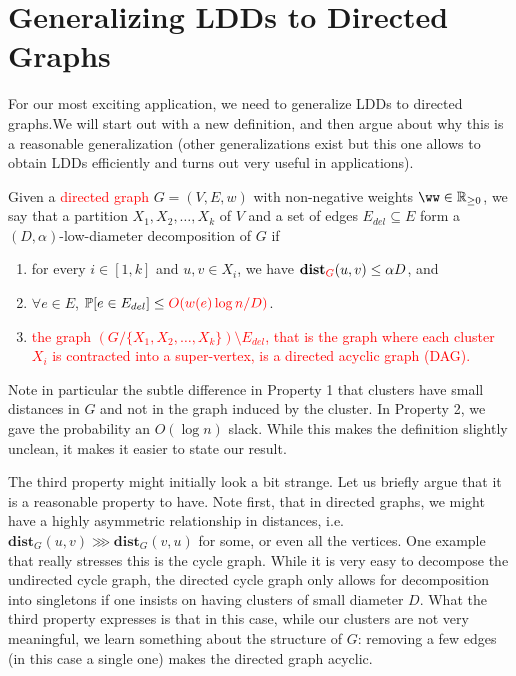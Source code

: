 \section{Generalizing LDDs to Directed Graphs}

For our most exciting application, we need to generalize LDDs to directed graphs.We will start out with a new definition, and then argue about why this is a reasonable generalization (other generalizations exist but this one allows to obtain LDDs efficiently and turns out very useful in applications).

\begin{definition}
Given a \textcolor{red}{directed graph} $G = (V,E,w)$ with non-negative weights $\ww \in \mathbb{R}_{\geq 0}$, we say that a partition $X_1, X_2, \ldots, X_k$ of $V$ and a set of edges $E_{del} \subseteq E$ form a $(D, \alpha)$-low-diameter decomposition of $G$ if
\begin{enumerate}
\item for every $i \in [1, k]$ and $u,v \in X_i$, we have $\mathbf{dist}_{\textcolor{red}{G}}(u,v) \leq \alpha D$, and
\item $\forall e \in E$, $\mathbb{P}[e \in E_{del}] \leq \textcolor{red}{O(w(e) \log n/ D)}$.
\item \textcolor{red}{the graph $(G / \{X_1, X_2, \ldots, X_k\}) \setminus E_{del}$, that is the graph where each cluster $X_i$ is contracted into a super-vertex, is a directed acyclic graph (DAG).}
\end{enumerate}
\end{definition}

Note in particular the subtle difference in Property 1 that clusters have small distances in $G$ and not in the graph induced by the cluster. In Property 2, we gave the probability an $O(\log n)$ slack. While this makes the definition slightly unclean, it makes it easier to state our result.

The third property might initially look a bit strange. Let us briefly argue that it is a reasonable property to have. Note first, that in directed graphs, we might have a highly asymmetric relationship in distances, i.e. $\mathbf{dist}_G(u,v) \ggg \mathbf{dist}_G(v,u)$ for some, or even all the vertices. One example that really stresses this is the cycle graph. While it is very easy to decompose the undirected cycle graph, the directed cycle graph only allows for decomposition into singletons if one insists on having clusters of small diameter $D$. What the third property expresses is that in this case, while our clusters are not very meaningful, we learn something about the structure of $G$: removing a few edges (in this case a single one) makes the directed graph acyclic. 

